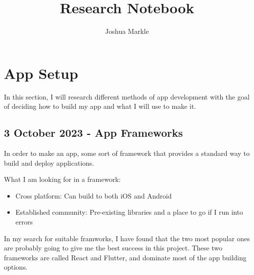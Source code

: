 \documentclass{article}
\title{Research Notebook}
\author{Joshua Markle}
\date{}
\begin{document}
\maketitle

\tableofcontents
\newpage

\section{App Setup}

In this section, I will research different methods of app development with the goal of deciding how to build my app and what I will use to make it.

\subsection{3 October 2023 - App Frameworks}

In order to make an app, some sort of framework that provides a standard way to build and deploy applications.

What I am looking for in a framework:

\begin{itemize}
				\item Cross platform: Can build to both iOS and Android
				\item Established community: Pre-existing libraries and a place to go if I run into errors
\end{itemize}

In my search for suitable framworks, I have found that the two most popular ones are probably going to give me the best success in this project. These two frameworks are called React and Flutter, and dominate most of the app building options.
\end{document}
